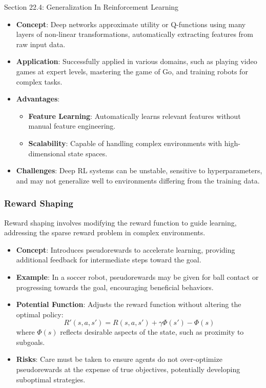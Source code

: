 \begin{notes}{Section 22.4: Generalization In Reinforcement Learning}
\begin{highlight}
        \begin{itemize}
            \item \textbf{Concept}: Deep networks approximate utility or Q-functions using many layers of non-linear transformations, automatically extracting features from raw input data.
            \item \textbf{Application}: Successfully applied in various domains, such as playing video games at expert levels, mastering the game of Go, and training robots for complex tasks.
            \item \textbf{Advantages}:
                \begin{itemize}
                    \item \textbf{Feature Learning}: Automatically learns relevant features without manual feature engineering.
                    \item \textbf{Scalability}: Capable of handling complex environments with high-dimensional state spaces.
                \end{itemize}
            \item \textbf{Challenges}: Deep RL systems can be unstable, sensitive to hyperparameters, and may not generalize well to environments differing from the training data.
        \end{itemize}
    
    \end{highlight}
    
    \subsubsection*{Reward Shaping}
    
    Reward shaping involves modifying the reward function to guide learning, addressing the sparse reward problem in complex environments.
    
    \begin{highlight}
    
        \begin{itemize}
            \item \textbf{Concept}: Introduces pseudorewards to accelerate learning, providing additional feedback for intermediate steps toward the goal.
            \item \textbf{Example}: In a soccer robot, pseudorewards may be given for ball contact or progressing towards the goal, encouraging beneficial behaviors.
            \item \textbf{Potential Function}: Adjusts the reward function without altering the optimal policy:
            \[
            R'(s, a, s') = R(s, a, s') + \gamma \Phi(s') - \Phi(s)
            \]
            where $\Phi(s)$ reflects desirable aspects of the state, such as proximity to subgoals.
            \item \textbf{Risks}: Care must be taken to ensure agents do not over-optimize pseudorewards at the expense of true objectives, potentially developing suboptimal strategies.
        \end{itemize}
    

\end{highlight}
\end{notes}
